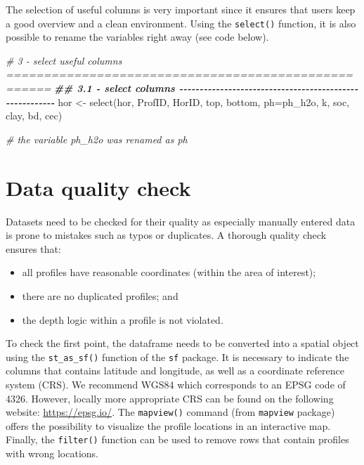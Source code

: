 \documentclass[
  10pt,
  b5paper,
  oneside]{book}
\newenvironment{Shaded}{\begin{snugshade}}{\end{snugshade}}
\newcommand{\AttributeTok}[1]{\textcolor[rgb]{0.77,0.63,0.00}{#1}}
\newcommand{\CommentTok}[1]{\textcolor[rgb]{0.56,0.35,0.01}{\textit{#1}}}
\newcommand{\DocumentationTok}[1]{\textcolor[rgb]{0.56,0.35,0.01}{\textbf{\textit{#1}}}}
\newcommand{\FunctionTok}[1]{\textcolor[rgb]{0.00,0.00,0.00}{#1}}
\newcommand{\NormalTok}[1]{#1}
\newcommand{\OtherTok}[1]{\textcolor[rgb]{0.56,0.35,0.01}{#1}}
\providecommand{\tightlist}{%
  \setlength{\itemsep}{0pt}\setlength{\parskip}{0pt}}
\begin{document}
The selection of useful columns is very important since it ensures that users keep a good overview and a clean environment. Using the \texttt{select()} function, it is also possible to rename the variables right away (see code below).

\begin{Shaded}
\begin{Highlighting}[]
\CommentTok{\# 3 {-} select useful columns ====================================================}
\DocumentationTok{\#\# 3.1 {-} select columns {-}{-}{-}{-}{-}{-}{-}{-}{-}{-}{-}{-}{-}{-}{-}{-}{-}{-}{-}{-}{-}{-}{-}{-}{-}{-}{-}{-}{-}{-}{-}{-}{-}{-}{-}{-}{-}{-}{-}{-}{-}{-}{-}{-}{-}{-}{-}{-}{-}{-}{-}{-}{-}{-}{-}{-}}
\NormalTok{hor }\OtherTok{\textless{}{-}} \FunctionTok{select}\NormalTok{(hor, ProfID, HorID, top, bottom, }\AttributeTok{ph=}\NormalTok{ph\_h2o, k, soc, clay, bd, cec)}

\CommentTok{\# the variable ph\_h2o was renamed as ph}
\end{Highlighting}
\end{Shaded}

\hypertarget{data-quality-check}{%
\section{Data quality check}\label{data-quality-check}}

Datasets need to be checked for their quality as especially manually entered data is prone to mistakes such as typos or duplicates. A thorough quality check ensures that:

\begin{itemize}
\tightlist
\item
  all profiles have reasonable coordinates (within the area of interest);
\item
  there are no duplicated profiles; and
\item
  the depth logic within a profile is not violated.
\end{itemize}

To check the first point, the dataframe needs to be converted into a spatial object using the \texttt{st\_as\_sf()} function of the \texttt{sf} package. It is necessary to indicate the columns that contains latitude and longitude, as well as a coordinate reference system (CRS). We recommend WGS84 which corresponds to an EPSG code of 4326. However, locally more appropriate CRS can be found on the following website: \url{https://epsg.io/}. The \texttt{mapview()} command (from \texttt{mapview} package) offers the possibility to visualize the profile locations in an interactive map. Finally, the \texttt{filter()} function can be used to remove rows that contain profiles with wrong locations.
\end{document}
